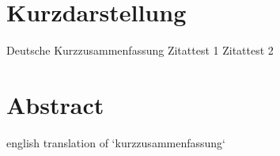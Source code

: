 \thispagestyle{empty}
\section*{Kurzdarstellung}
\label{sec:kurzdarstellung}

Deutsche Kurzzusammenfassung
Zitattest 1 \cite{Kuhnapfel.2019}
Zitattest 2 \cite{Rogers.2011}


\section*{Abstract}
\label{sec:abstract}
english translation of `kurzzusammenfassung`


